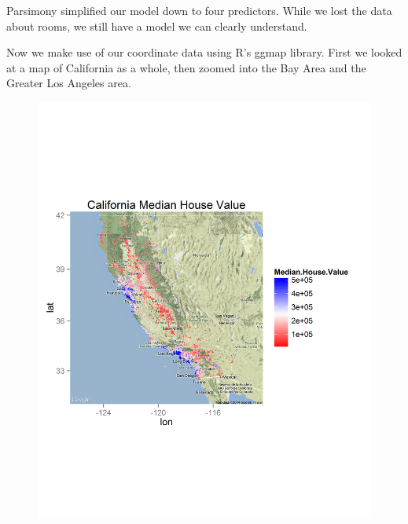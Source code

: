 \documentclass[letter]{article}
\begin{document}
Parsimony simplified our model down to four predictors. While we lost the data about rooms, we still have a model we can clearly understand.  

Now we make use of our coordinate data using R's ggmap library. First we looked at a map of California as a whole, then zoomed into the Bay Area and the Greater Los Angeles area.

\newpage
\begin{figure}[H]
\includegraphics[scale=.54]{figures/california.png}

\end{figure}
\end{document}
